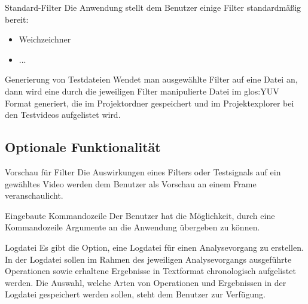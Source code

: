  Standard-Filter
\newline
Die Anwendung stellt dem Benutzer einige Filter standardmäßig bereit:
\begin{itemize}
\item Weichzeichner
\item ...
\end{itemize}

 Generierung von Testdateien
\newline
Wendet man ausgewählte Filter auf eine Datei an, dann wird eine durch die jeweiligen Filter manipulierte Datei im \gls{glos:YUV} Format generiert, die im Projektordner gespeichert und im Projektexplorer bei den Testvideos aufgelistet wird.





\subsection{Optionale Funktionalität}

 Vorschau für Filter
\newline
Die Auswirkungen eines Filters oder Testsignals auf ein gewähltes Video werden dem Benutzer als Vorschau an einem Frame veranschaulicht.


 Eingebaute Kommandozeile
\newline
Der Benutzer hat die Möglichkeit, durch eine Kommandozeile Argumente an die Anwendung übergeben zu können.

 Logdatei
\newline
Es gibt die Option, eine Logdatei für einen Analysevorgang zu erstellen. In der Logdatei sollen im Rahmen
 des jeweiligen Analysevorgangs ausgeführte Operationen sowie erhaltene Ergebnisse in Textformat
  chronologisch aufgelistet werden. Die Auswahl, welche Arten von Operationen und Ergebnissen in der
   Logdatei gespeichert werden sollen, steht dem Benutzer zur Verfügung.
